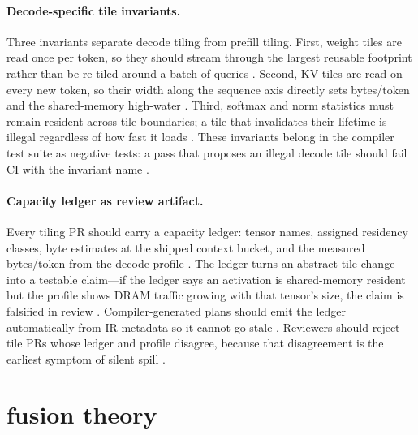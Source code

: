 \paragraph{Decode-specific tile invariants.}
Three invariants separate decode tiling from prefill tiling. First, weight tiles are read once per token, so they should stream through the largest reusable footprint rather than be re-tiled around a batch of queries \citep{kwon2023vllm,patel2025llminference}. Second, KV tiles are read on every new token, so their width along the sequence axis directly sets bytes/token and the shared-memory high-water \citep{dao2022flashattention,dao2023flashdecoding}. Third, softmax and norm statistics must remain resident across tile boundaries; a tile that invalidates their lifetime is illegal regardless of how fast it loads \citep{dao2022flashattention,yirage2026}. These invariants belong in the compiler test suite as negative tests: a pass that proposes an illegal decode tile should fail CI with the invariant name \citep{memoryfloor2026,chen2020compilerbasedhardw}.

\paragraph{Capacity ledger as review artifact.}
Every tiling PR should carry a capacity ledger: tensor names, assigned residency classes, byte estimates at the shipped context bucket, and the measured bytes/token from the decode profile \citep{semianalysis2024tma,memoryfloor2026,yirage2026}. The ledger turns an abstract tile change into a testable claim---if the ledger says an activation is shared-memory resident but the profile shows DRAM traffic growing with that tensor's size, the claim is falsified in review \citep{taxbreak2026,patel2025llminference}. Compiler-generated plans should emit the ledger automatically from IR metadata so it cannot go stale \citep{chen2020compilerbasedhardw,yirage2026}. Reviewers should reject tile PRs whose ledger and profile disagree, because that disagreement is the earliest symptom of silent spill \citep{memoryfloor2026,taxbreak2026}.

\section{fusion theory}
\label{sec:ch13_fusion_theory}


